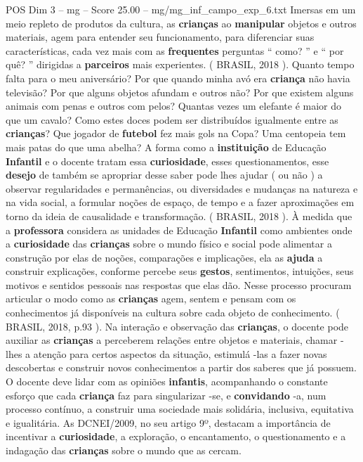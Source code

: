 \begin{textsample}{POS Dim 3 – mg – Score 25.00 – mg/mg\_inf\_campo\_exp\_6.txt}
Imersas em um meio repleto de produtos da cultura, as \textbf{crianças} ao \textbf{manipular} objetos e outros materiais, agem para entender seu funcionamento, para diferenciar suas características, cada vez mais com as \textbf{frequentes} perguntas “ como? ” e “ por quê? ” dirigidas a \textbf{parceiros} mais experientes. ( BRASIL, 2018 ).
Quanto tempo falta para o meu aniversário?
Por que quando minha avó era \textbf{criança} não havia televisão?
Por que alguns objetos afundam e outros não?
Por que existem alguns animais com penas e outros com pelos?
Quantas vezes um elefante é maior do que um cavalo?
Como estes doces podem ser distribuídos igualmente entre as \textbf{crianças}?
Que jogador de \textbf{futebol} fez mais gols na Copa?
Uma centopeia tem mais patas do que uma abelha?
A forma como a \textbf{instituição} de Educação \textbf{Infantil} e o docente tratam essa \textbf{curiosidade}, esses questionamentos, esse \textbf{desejo} de também se apropriar desse saber pode lhes ajudar ( ou não ) a observar regularidades e permanências, ou diversidades e mudanças na natureza e na vida social, a formular noções de espaço, de tempo e a fazer aproximações em torno da ideia de causalidade e transformação. ( BRASIL, 2018 ).
À medida que a \textbf{professora} considera as unidades de Educação \textbf{Infantil} como ambientes onde a \textbf{curiosidade} das \textbf{crianças} sobre o mundo físico e social pode alimentar a construção por elas de noções, comparações e implicações, ela as \textbf{ajuda} a construir explicações, conforme percebe seus \textbf{gestos}, sentimentos, intuições, seus motivos e sentidos pessoais nas respostas que elas dão.
Nesse processo procuram articular o modo como as \textbf{crianças} agem, sentem e pensam com os conhecimentos já disponíveis na cultura sobre cada objeto de conhecimento. ( BRASIL, 2018, p.93 ).
Na interação e observação das \textbf{crianças}, o docente pode auxiliar as \textbf{crianças} a perceberem relações entre objetos e materiais, chamar -lhes a atenção para certos aspectos da situação, estimulá -las a fazer novas descobertas e construir novos conhecimentos a partir dos saberes que já possuem.
O docente deve lidar com as opiniões \textbf{infantis}, acompanhando o constante esforço que cada \textbf{criança} faz para singularizar -se, e \textbf{convidando} -a, num processo contínuo, a construir uma sociedade mais solidária, inclusiva, equitativa e igualitária.
As DCNEI/2009, no seu artigo 9º, destacam a importância de incentivar a \textbf{curiosidade}, a exploração, o encantamento, o questionamento e a indagação das \textbf{crianças} sobre o mundo que as cercam.

\end{textsample}

